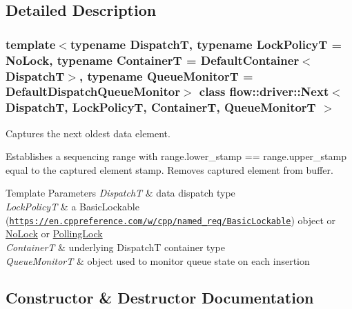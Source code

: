 \subsection{Detailed Description}
\subsubsection*{template$<$typename DispatchT, typename Lock\+PolicyT = No\+Lock, typename ContainerT = Default\+Container$<$\+Dispatch\+T$>$, typename Queue\+MonitorT = Default\+Dispatch\+Queue\+Monitor$>$\newline
class flow\+::driver\+::\+Next$<$ Dispatch\+T, Lock\+Policy\+T, Container\+T, Queue\+Monitor\+T $>$}

Captures the next oldest data element. 

Establishes a sequencing range with {\ttfamily range.\+lower\+\_\+stamp == range.\+upper\+\_\+stamp} equal to the captured element stamp. Removes captured element from buffer.


\begin{DoxyTemplParams}{Template Parameters}
{\em DispatchT} & data dispatch type \\
\hline
{\em Lock\+PolicyT} & a Basic\+Lockable (\href{https://en.cppreference.com/w/cpp/named_req/BasicLockable}{\tt https\+://en.\+cppreference.\+com/w/cpp/named\+\_\+req/\+Basic\+Lockable}) object or \hyperlink{structflow_1_1_no_lock}{No\+Lock} or \hyperlink{structflow_1_1_polling_lock}{Polling\+Lock} \\
\hline
{\em ContainerT} & underlying {\ttfamily DispatchT} container type \\
\hline
{\em Queue\+MonitorT} & object used to monitor queue state on each insertion \\
\hline
\end{DoxyTemplParams}


\subsection{Constructor \& Destructor Documentation}
\mbox{\label{classflow_1_1driver_1_1_next_a1313d1526a137be521b64bc9758a809e}} 
